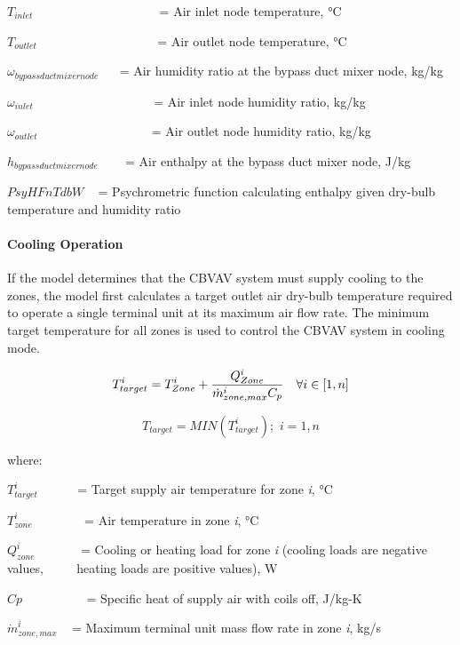 \({T_{inlet}}\) ~~~~~~~~~~~~~~~~~~~ = Air inlet node temperature, °C

\({T_{outlet}}\) ~~~~~~~~~~~~~~~~~~ = Air outlet node temperature, °C

\({\omega_{bypassductmixernode}}\) ~~ = Air humidity ratio at the bypass duct mixer node, kg/kg

\({\omega_{inlet}}\) ~~~~~~~~~~~~~~~~~~ = Air inlet node humidity ratio, kg/kg

\({\omega_{outlet}}\) ~~~~~~~~~~~~~~~~~ = Air outlet node humidity ratio, kg/kg

\({h_{bypassductmixernode}}\) ~~~ = Air enthalpy at the bypass duct mixer node, J/kg

\(PsyHFnTdbW\) ~ = Psychrometric function calculating enthalpy given dry-bulb temperature and humidity ratio

\paragraph{Cooling Operation}\label{cooling-operation}

If the model determines that the CBVAV system must supply cooling to the zones, the model first calculates a target outlet air dry-bulb temperature required to operate a single terminal unit at its maximum air flow rate. The minimum target temperature for all zones is used to control the CBVAV system in cooling mode.

\begin{equation}
  T_{target}^i = T_{Zone}^i + \frac{Q_{Zone}^i}{\dot{m}_{zone,max}^i C_p} \quad \forall i \in \RB{1,n}
\end{equation}

\begin{equation}
{T_{target}} = MIN\left( {T_{target}^i} \right);\,\,i = 1,n
\end{equation}

where:

\(T_{target}^i\) ~~~~~ = Target supply air temperature for zone \emph{i}, °C

\(T_{zone}^i\) ~~~~~~~ = Air temperature in zone \emph{i}, °C

\(Q_{zone}^i\) ~~~~~~ = Cooling or heating load for zone \emph{i} (cooling loads are negative values, ~~~~ heating loads are positive values), W

\(Cp\) ~~~~~~~~~ = Specific heat of supply air with coils off, J/kg-K

\(\dot m_{zone,max}^i\) ~ = Maximum terminal unit mass flow rate in zone \emph{i}, kg/s

